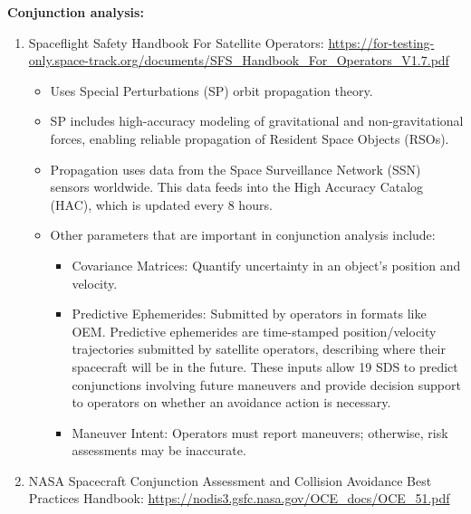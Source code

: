 \documentclass[12pt]{report}
\begin{document}
\noindent \textbf{Conjunction analysis:}
\begin{enumerate}

  \item Spaceflight Safety Handbook For Satellite Operators: \url{https://for-testing-only.space-track.org/documents/SFS_Handbook_For_Operators_V1.7.pdf}

  \begin{itemize}
    \item Uses Special Perturbations (SP) orbit propagation theory.
    \item SP includes high-accuracy modeling of gravitational and non-gravitational forces, enabling reliable propagation of Resident Space Objects (RSOs).
    \item Propagation uses data from the Space Surveillance Network (SSN) sensors worldwide. This data feeds into the High Accuracy Catalog (HAC), which is updated every 8 hours.
    \item Other parameters that are important in conjunction analysis include:
    \begin{itemize}
      \item Covariance Matrices: Quantify uncertainty in an object's position and velocity.
      \item Predictive Ephemerides: Submitted by operators in formats like OEM. Predictive ephemerides are time-stamped position/velocity trajectories submitted by satellite operators, describing where their spacecraft will be in the future. These inputs allow 19 SDS to predict conjunctions involving future maneuvers and provide decision support to operators on whether an avoidance action is necessary.
      \item Maneuver Intent: Operators must report maneuvers; otherwise, risk assessments may be inaccurate.
    \end{itemize}
  \end{itemize}

   \item NASA Spacecraft Conjunction Assessment and Collision Avoidance Best Practices Handbook: \url{https://nodis3.gsfc.nasa.gov/OCE_docs/OCE_51.pdf}


\end{enumerate}
\end{document}
